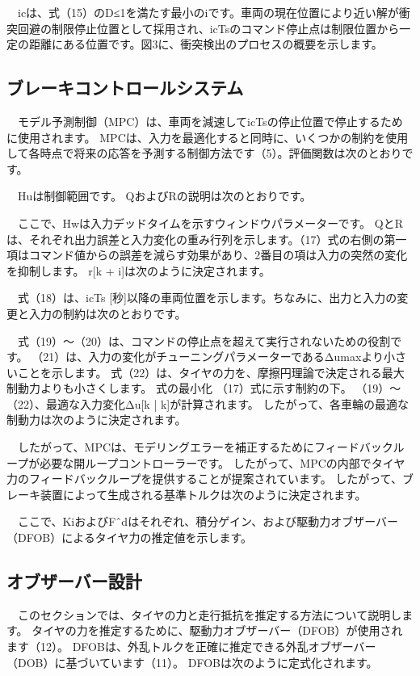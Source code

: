 　icは、式（15）のD≤1を満たす最小のiです。車両の現在位置により近い解が衝突回避の制限停止位置として採用され、icTsのコマンド停止点は制限位置から一定の距離にある位置です。図3に、衝突検出のプロセスの概要を示します。

\subsection{ブレーキコントロールシステム}
　モデル予測制御（MPC）は、車両を減速してicTsの停止位置で停止するために使用されます。 MPCは、入力を最適化すると同時に、いくつかの制約を使用して各時点で将来の応答を予測する制御方法です（5）。評価関数は次のとおりです。

　Huは制御範囲です。 QおよびRの説明は次のとおりです。

　ここで、Hwは入力デッドタイムを示すウィンドウパラメーターです。 QとRは、それぞれ出力誤差と入力変化の重み行列を示します。（17）式の右側の第一項はコマンド値からの誤差を減らす効果があり、2番目の項は入力の突然の変化を抑制します。 r[k + i]は次のように決定されます。

　式（18）は、icTs [秒]以降の車両位置を示します。ちなみに、出力と入力の変更と入力の制約は次のとおりです。

　式（19）〜（20）は、コマンドの停止点を超えて実行されないための役割です。 （21）は、入力の変化がチューニングパラメーターであるΔumaxより小さいことを示します。 式（22）は、タイヤの力を、摩擦円理論で決定される最大制動力よりも小さくします。 式の最小化 （17）式に示す制約の下。 （19）〜（22）、最適な入力変化Δu[k | k]が計算されます。 したがって、各車輪の最適な制動力は次のように決定されます。

　したがって、MPCは、モデリングエラーを補正するためにフィードバックループが必要な開ループコントローラーです。 したがって、MPCの内部でタイヤ力のフィードバックループを提供することが提案されています。 したがって、ブレーキ装置によって生成される基準トルクは次のように決定されます。

　ここで、KiおよびFˆdはそれぞれ、積分ゲイン、および駆動力オブザーバー（DFOB）によるタイヤ力の推定値を示します。

\subsection{オブザーバー設計}
　このセクションでは、タイヤの力と走行抵抗を推定する方法について説明します。 タイヤの力を推定するために、駆動力オブザーバー（DFOB）が使用されます（12）。 DFOBは、外乱トルクを正確に推定できる外乱オブザーバー（DOB）に基づいています（11）。 DFOBは次のように定式化されます。

